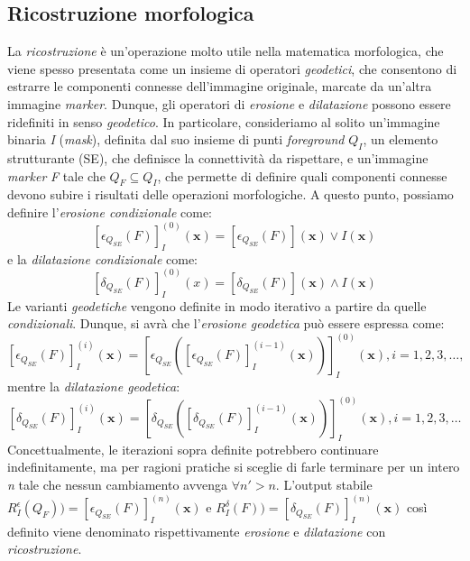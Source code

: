 \subsection{Ricostruzione morfologica}
La \textit{ricostruzione} \`e un'operazione molto utile nella matematica morfologica, che viene spesso presentata come un insieme di operatori \textit{geodetici}, che consentono di estrarre le componenti connesse dell'immagine originale, marcate da un'altra immagine \textit{marker}. Dunque, gli operatori di \textit{erosione} e \textit{dilatazione} possono essere ridefiniti in senso \textit{geodetico}. In particolare, consideriamo al solito un'immagine binaria \textit{I} (\textit{mask}), definita dal suo insieme di punti \textit{foreground} $Q_{I}$, un elemento strutturante (SE), che definisce la connettivit\`a da rispettare, e un'immagine \textit{marker} \textit{F} tale che $Q_{F} \subseteq Q_{I}$, che permette di definire quali componenti connesse devono subire i risultati delle operazioni morfologiche. A questo punto, possiamo definire l'\textit{erosione condizionale} come:
\begin{equation}
	\label{eq:conditional-erosion}
	[\epsilon_{Q_{SE}}(F)]^{(0)}_{I}(\textbf{x}) = [\epsilon_{Q_{SE}}(F)](\textbf{x}) \vee I(\textbf{x})
\end{equation}
e la \textit{dilatazione condizionale} come:
\begin{equation}
	\label{eq:conditional-dilation}
	[\delta_{Q_{SE}}(F)]^{(0)}_{I}(x) = [\delta_{Q_{SE}}(F)](\textbf{x}) \wedge I(\textbf{x})
\end{equation}
Le varianti \textit{geodetiche} vengono definite in modo iterativo a partire da quelle \textit{condizionali}. Dunque, si avr\`a che l'\textit{erosione geodetica} pu\`o essere espressa come:
\begin{equation}
	\label{eq:geodesic-erosion}
	[\epsilon_{Q_{SE}}(F)]^{(i)}_{I}(\textbf{x}) = [\epsilon_{Q_{SE}}([\epsilon_{Q_{SE}}(F)]^{(i-1)}_{I}(\textbf{x}))]^{(0)}_{I}(\textbf{x}), i=1,2,3,\dots,
\end{equation}
mentre la \textit{dilatazione geodetica}:
\begin{equation}
	\label{eq:geodesic-dilation}
	[\delta_{Q_{SE}}(F)]^{(i)}_{I}(\textbf{x}) = [\delta_{Q_{SE}}([\delta_{Q_{SE}}(F)]^{(i-1)}_{I}(\textbf{x}))]^{(0)}_{I}(\textbf{x}), i=1,2,3,\dots
\end{equation}
Concettualmente, le iterazioni sopra definite potrebbero continuare indefinitamente, ma per ragioni pratiche si sceglie di farle terminare per un intero \textit{n} tale che nessun cambiamento avvenga $\forall n' > n$. L'output stabile $R^{\epsilon}_{I}(Q_{F}))=[\epsilon_{Q_{SE}}(F)]^{(n)}_{I}(\textbf{x})$ e $R^{\delta}_{I}(F))=[\delta_{Q_{SE}}(F)]^{(n)}_{I}(\textbf{x})$ cos\`i definito viene denominato rispettivamente \textit{erosione} e \textit{dilatazione} con \textit{ricostruzione}.

